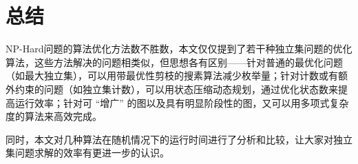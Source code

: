 \documentclass[lang=cn,11pt,a4paper]{elegantpaper}
\begin{document}
\section{总结}
NP-Hard问题的算法优化方法数不胜数，本文仅仅提到了若干种独立集问题的优化算法，这些方法解决的问题相类似，但思想各有区别——针对普通的最优化问题（如最大独立集），可以用带最优性剪枝的搜素算法减少枚举量；针对计数或有额外约束的问题（如独立集计数），可以用状态压缩动态规划，通过优化状态数来提高运行效率；针对可 “增广” 的图以及具有明显阶段性的图，又可以用多项式复杂度的算法来高效完成。

同时，本文对几种算法在随机情况下的运行时间进行了分析和比较，让大家对独立集问题求解的效率有更进一步的认识。



\end{document}
